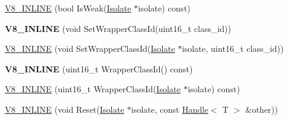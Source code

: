 \begin{DoxyCompactItemize}
\item 
\hyperlink{classv8_1_1_persistent_acfa08355e94e227b6319123d40cd8710}{V8\+\_\+\+I\+N\+L\+I\+N\+E} (bool Is\+Weak(\hyperlink{classv8_1_1_isolate}{Isolate} $\ast$isolate) const)
\item 
\hypertarget{classv8_1_1_persistent_a57a08d23ba324fee6b86e4df808e1d6d}{}{\bfseries V8\+\_\+\+I\+N\+L\+I\+N\+E} (void Set\+Wrapper\+Class\+Id(uint16\+\_\+t class\+\_\+id))\label{classv8_1_1_persistent_a57a08d23ba324fee6b86e4df808e1d6d}

\item 
\hyperlink{classv8_1_1_persistent_a929e7d86fc54c414931805e01e3af9e4}{V8\+\_\+\+I\+N\+L\+I\+N\+E} (void Set\+Wrapper\+Class\+Id(\hyperlink{classv8_1_1_isolate}{Isolate} $\ast$isolate, uint16\+\_\+t class\+\_\+id))
\item 
\hypertarget{classv8_1_1_persistent_aea12008dfeca52acd8e687187c25e4b7}{}{\bfseries V8\+\_\+\+I\+N\+L\+I\+N\+E} (uint16\+\_\+t Wrapper\+Class\+Id() const)\label{classv8_1_1_persistent_aea12008dfeca52acd8e687187c25e4b7}

\item 
\hyperlink{classv8_1_1_persistent_a212b9d40b2152e00fe9e7e028c296fea}{V8\+\_\+\+I\+N\+L\+I\+N\+E} (uint16\+\_\+t Wrapper\+Class\+Id(\hyperlink{classv8_1_1_isolate}{Isolate} $\ast$isolate) const)
\item 
\hyperlink{classv8_1_1_persistent_a55b4861576f082c14bb86af2bc3b88bf}{V8\+\_\+\+I\+N\+L\+I\+N\+E} (void Reset(\hyperlink{classv8_1_1_isolate}{Isolate} $\ast$isolate, const \hyperlink{classv8_1_1_handle}{Handle}$<$ T $>$ \&other))
\end{DoxyCompactItemize}
